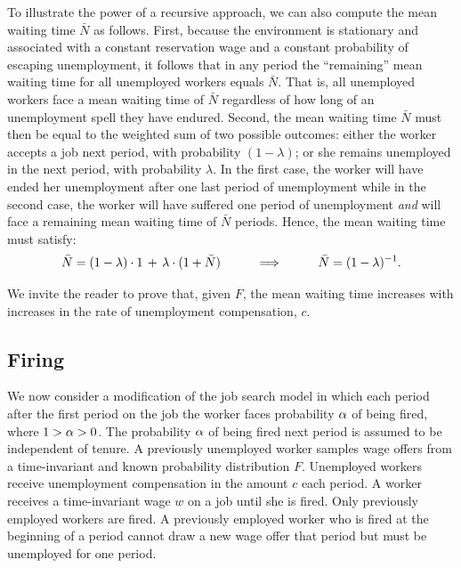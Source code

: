 To illustrate the power of  a recursive approach, we can also
compute the mean waiting time $\bar N$ as follows. First, because the  environment is stationary
and associated with a constant
reservation wage and a constant probability of escaping unemployment, it
follows that  in any  period the ``remaining'' mean waiting time for all unemployed workers
equals $\bar N$. That is, all unemployed workers face
a mean waiting time of $\bar N$ regardless of
how long of an unemployment spell they have endured.
Second, the mean waiting time $\bar N$ must then be equal to the weighted
sum of two possible outcomes: either the worker accepts a job next period,
with probability $(1-\lambda)$; or she remains unemployed in the next
period, with probability $\lambda$. In the first case, the worker will have
ended her unemployment after one last period of unemployment while in the
second case, the worker will have suffered one period of unemployment {\it and}
will face a remaining mean waiting time of $\bar N$ periods. Hence, the
mean waiting time must satisfy:
$$
\bar N = (1-\lambda)\cdot 1 \,+\, \lambda \cdot (1 + \bar N)
\hskip1cm \Longrightarrow \hskip1cm  \bar N = (1-\lambda)^{-1}.
$$

We invite the reader to prove that, given $F$, the mean waiting time
increases with increases in the rate of unemployment compensation, $c$.

\subsection{Firing}\label{firing}%
We now consider a modification of the job search model in which each
period after the first period on the job the worker faces probability
$\alpha$
of being fired, where
$1>\alpha>0$.  The probability $\alpha$ of being fired next period is assumed to
be independent of tenure.  A previously unemployed worker samples wage offers from a
time-invariant and known probability distribution $F$. Unemployed workers receive
unemployment compensation in the amount $c$ each period. A  worker receives a
time-invariant wage $w$ on a job until she is fired. Only previously employed workers are fired.
A previously employed worker who is fired at the beginning of a period cannot draw a new wage offer that period but must
be unemployed for one period.

